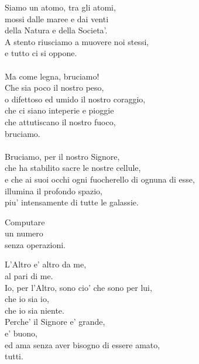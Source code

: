 \begin{haiku}
    Siamo un atomo, tra gli atomi,\\
    mossi dalle maree e dai venti \\
    della Natura e della Societa'.\\
    A stento riusciamo a muovere noi stessi,\\
    e tutto ci si oppone.\\
    \leavevmode\\
    Ma come legna, bruciamo!\\
    Che sia poco il nostro peso,\\
    o difettoso ed umido il nostro coraggio,\\
    che ci siano inteperie e pioggie\\
    che attutiscano il nostro fuoco,\\
    bruciamo.\\
    \leavevmode\\
    Bruciamo, per il nostro Signore,\\
    che ha stabilito sacre le nostre cellule,\\
    e che ai suoi occhi ogni fuocherello di ognuna di esse,\\
    illumina il profondo spazio,\\
    piu' intensamente di tutte le galassie.\\
\end{haiku}

\begin{haiku}
    Computare\\
    un numero\\
    senza operazioni.\\
\end{haiku}

\begin{haiku}
    L'Altro e' altro da me,\\
    al pari di me.\\
    Io, per l'Altro, sono cio' che sono per lui,\\
    che io sia io,\\
    che io sia niente.\\
    Perche' il Signore e' grande,\\
    e' buono,\\
    ed ama senza aver bisogno di essere amato,\\
    tutti.\\
\end{haiku}

